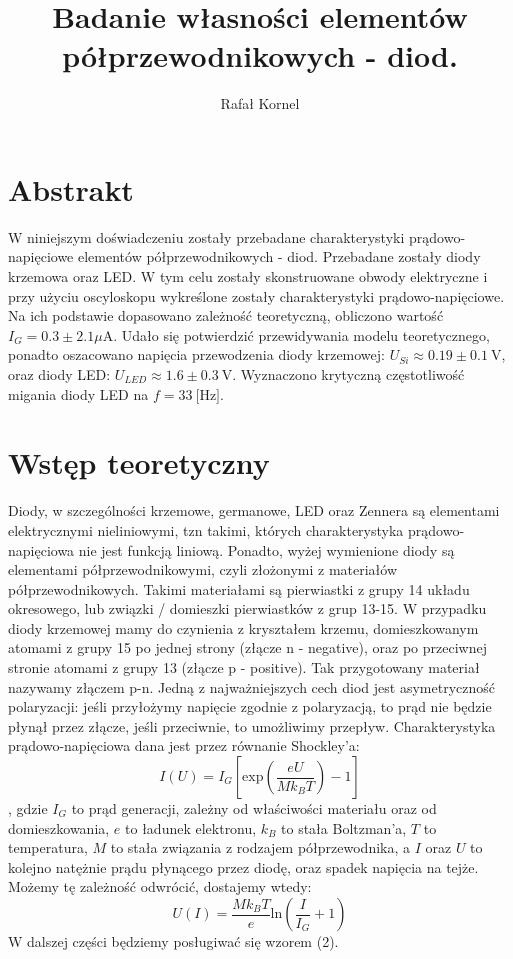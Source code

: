 \documentclass[10pt,a4paper]{article}
\author{Rafał Kornel}
\title{\textbf{Badanie własności elementów półprzewodnikowych - diod.}}
\date{}
\begin{document}
\maketitle

\section*{Abstrakt}
W niniejszym doświadczeniu zostały przebadane charakterystyki prądowo-napięciowe elementów półprzewodnikowych - diod. Przebadane zostały diody krzemowa oraz LED. W tym celu zostały skonstruowane obwody elektryczne i przy użyciu oscyloskopu wykreślone zostały charakterystyki prądowo-napięciowe. Na ich podstawie dopasowano zależność teoretyczną, obliczono wartość $I_G = 0.3 \pm 2.1 \text{$\mu$A}$. Udało się potwierdzić przewidywania modelu teoretycznego, ponadto oszacowano napięcia przewodzenia diody krzemowej: $U_{Si} \approx 0.19 \pm 0.1 \ \text{V} $, oraz diody LED: $ U_{LED} \approx 1.6 \pm 0.3 \ \text{V} $. Wyznaczono krytyczną częstotliwość migania diody LED na $f = 33 \ \text{[Hz]}$.

\section*{Wstęp teoretyczny}
Diody, w szczególności krzemowe, germanowe, LED oraz Zennera są elementami elektrycznymi nieliniowymi, tzn takimi, których charakterystyka prądowo-napięciowa nie jest funkcją liniową. Ponadto, wyżej wymienione diody są elementami półprzewodnikowymi, czyli złożonymi z materiałów półprzewodnikowych. Takimi materiałami są pierwiastki z grupy 14 układu okresowego, lub związki / domieszki pierwiastków z grup 13-15. W przypadku diody krzemowej mamy do czynienia z kryształem krzemu, domieszkowanym atomami z grupy 15 po jednej strony (złącze n - negative), oraz po przeciwnej stronie atomami z grupy 13 (złącze p - positive). Tak przygotowany materiał nazywamy złączem p-n. Jedną z najważniejszych cech diod jest asymetryczność polaryzacji: jeśli przyłożymy napięcie zgodnie z polaryzacją, to prąd nie będzie płynął przez złącze, jeśli przeciwnie, to umożliwimy przepływ. Charakterystyka prądowo-napięciowa dana jest przez równanie Shockley'a:
\begin{equation}
I(U) = I_G[\text{exp}(\frac{eU}{Mk_BT}) - 1 ]
\end{equation},
gdzie $I_G$ to prąd generacji, zależny od właściwości materiału oraz od domieszkowania, $e$ to ładunek elektronu, $k_B$ to stała Boltzman'a, $T$ to temperatura, $M$ to stała związania z rodzajem półprzewodnika, a $I$ oraz $U$ to kolejno natężnie prądu płynącego przez diodę, oraz spadek napięcia na tejże.
Możemy tę zależność odwrócić, dostajemy wtedy:
\begin{equation}
U(I) = \frac{Mk_BT}{e}\text{ln}(\frac{I}{I_G} + 1) 
\end{equation}
W dalszej części będziemy posługiwać się wzorem (2).
\end{document}
